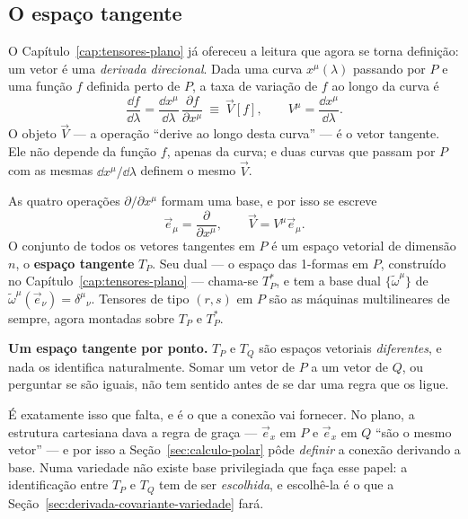 \documentclass[12pt,a4paper,oneside]{book}
\theoremstyle{rgplain}
\theoremstyle{rgremark}
\begin{document}
\subsection*{O espaço tangente}

O Capítulo~\ref{cap:tensores-plano} já ofereceu a leitura que agora se torna
definição: um vetor é uma \emph{derivada direcional}. Dada uma curva
$x^\mu(\lambda)$ passando por $P$ e uma função $f$ definida perto de $P$, a
taxa de variação de $f$ ao longo da curva é
\begin{equation}
  \frac{\dd f}{\dd\lambda}
  =\frac{\dd x^\mu}{\dd\lambda}\,\frac{\partial f}{\partial x^\mu}
  \ \equiv\ \vec V[f] ,
  \qquad
  V^\mu=\frac{\dd x^\mu}{\dd\lambda} .
  \label{eq:vetor-derivada}
\end{equation}
O objeto $\vec V$ --- a operação ``derive ao longo desta curva'' --- é o vetor
tangente. Ele não depende da função $f$, apenas da curva; e duas curvas que
passam por $P$ com as mesmas $\dd x^\mu/\dd\lambda$ definem o mesmo $\vec V$.

As quatro operações $\partial/\partial x^\mu$ formam uma base, e por isso se
escreve
\begin{equation}
  \vec e_\mu=\frac{\partial}{\partial x^\mu} ,
  \qquad
  \vec V=V^\mu\vec e_\mu .
  \label{eq:base-coordenada-variedade}
\end{equation}
O conjunto de todos os vetores tangentes em $P$ é um espaço vetorial de
dimensão $n$, o \textbf{espaço tangente} $T_P$. Seu dual --- o espaço das
1-formas em $P$, construído no Capítulo~\ref{cap:tensores-plano} --- chama-se
$T^*_P$, e tem a base dual $\{\tilde\omega^\mu\}$ de
$\tilde\omega^\mu(\vec e_\nu)=\delta^\mu{}_\nu$. Tensores de tipo $(r,s)$ em
$P$ são as máquinas multilineares de sempre, agora montadas sobre $T_P$ e
$T^*_P$.

\begin{central}
\textbf{Um espaço tangente por ponto.} $T_P$ e $T_Q$ são espaços vetoriais
\emph{diferentes}, e nada os identifica naturalmente. Somar um vetor de $P$ a
um vetor de $Q$, ou perguntar se são iguais, não tem sentido antes de se dar
uma regra que os ligue.

É exatamente isso que falta, e é o que a conexão vai fornecer. No plano, a
estrutura cartesiana dava a regra de graça --- $\vec e_x$ em $P$ e $\vec e_x$
em $Q$ ``são o mesmo vetor'' --- e por isso a Seção~\ref{sec:calculo-polar}
pôde \emph{definir} a conexão derivando a base. Numa variedade não existe
base privilegiada que faça esse papel: a identificação entre $T_P$ e $T_Q$
tem de ser \emph{escolhida}, e escolhê-la é o que a
Seção~\ref{sec:derivada-covariante-variedade} fará.
\end{central}
\end{document}
